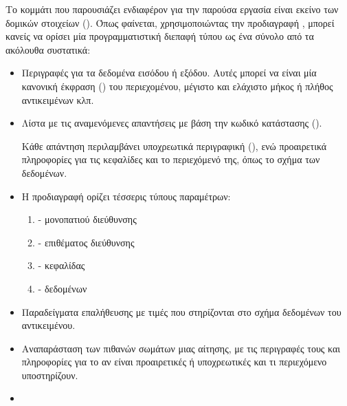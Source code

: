 Το κομμάτι που παρουσιάζει ενδιαφέρον για την παρούσα εργασία είναι εκείνο των δομικών στοιχείων ().
Όπως φαίνεται, χρησιμοποιώντας την προδιαγραφή ,
μπορεί κανείς να ορίσει μία προγραμματιστική διεπαφή τύπου  ως ένα σύνολο από τα ακόλουθα συστατικά:

\begin{itemize}
    \item \underline{}
    
    Περιγραφές για τα δεδομένα εισόδου ή εξόδου. Αυτές μπορεί να είναι μία κανονική έκφραση () του περιεχομένου,
    μέγιστο και ελάχιστο μήκος ή πλήθος αντικειμένων κλπ.

    \item \underline{}
    
    Λίστα με τις αναμενόμενες απαντήσεις με βάση την κωδικό κατάστασης ().
    
    Κάθε απάντηση περιλαμβάνει υποχρεωτικά περιγραφική (), 
    ενώ προαιρετικά πληροφορίες για τις κεφαλίδες και το περιεχόμενό της, 
    όπως το σχήμα των δεδομένων.

    \item \underline{}
    
    Η προδιαγραφή  ορίζει τέσσερις τύπους παραμέτρων:

    \begin{enumerate}
        \item {} - μονοπατιού διεύθυνσης
        \item {} - επιθέματος διεύθυνσης
        \item {} - κεφαλίδας 
        \item {} - δεδομένων 
    \end{enumerate}

    \item \underline{}
    
    Παραδείγματα επαλήθευσης με τιμές που στηρίζονται στο σχήμα δεδομένων του αντικειμένου.

    \item \underline{}
    
    Αναπαράσταση των πιθανών σωμάτων μιας αίτησης, 
    με τις περιγραφές τους και πληροφορίες για το αν είναι προαιρετικές ή υποχρεωτικές
    και τι περιεχόμενο υποστηρίζουν.

    \item \underline{}
    

\end{itemize}
